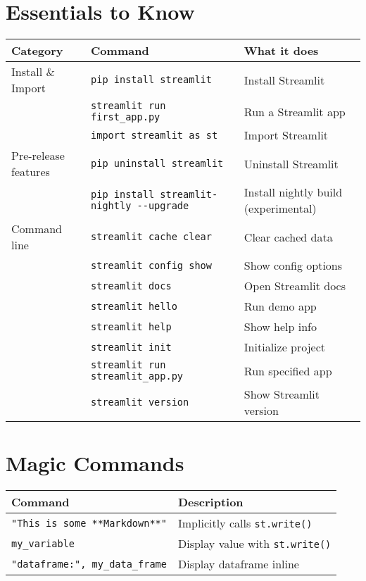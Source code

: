 \documentclass[11pt,a4paper]{article}
\begin{document}
\section*{Essentials to Know}
\begin{longtable}{|L{2cm}|L{8cm}|L{6cm}|}
\hline
\textbf{Category} & \textbf{Command} & \textbf{What it does} \\ \hline
Install \& Import & \verb|pip install streamlit| & Install Streamlit \\ \hline
 & \verb|streamlit run first_app.py| & Run a Streamlit app \\ \hline
 & \verb|import streamlit as st| & Import Streamlit \\ \hline
Pre-release features & \verb|pip uninstall streamlit| & Uninstall Streamlit \\ \hline
 & \verb|pip install streamlit-nightly --upgrade| & Install nightly build (experimental) \\ \hline
Command line & \verb|streamlit cache clear| & Clear cached data \\ \hline
 & \verb|streamlit config show| & Show config options \\ \hline
 & \verb|streamlit docs| & Open Streamlit docs \\ \hline
 & \verb|streamlit hello| & Run demo app \\ \hline
 & \verb|streamlit help| & Show help info \\ \hline
 & \verb|streamlit init| & Initialize project \\ \hline
 & \verb|streamlit run streamlit_app.py| & Run specified app \\ \hline
 & \verb|streamlit version| & Show Streamlit version \\ \hline
\end{longtable}

\section*{Magic Commands}
\begin{longtable}{|L{6cm}|L{10cm}|}
\hline
\textbf{Command} & \textbf{Description} \\ \hline
\verb|"This is some **Markdown**"| & Implicitly calls \verb|st.write()| \\ \hline
\verb|my_variable| & Display value with \verb|st.write()| \\ \hline
\verb|"dataframe:", my_data_frame| & Display dataframe inline \\ \hline
\end{longtable}
\end{document}
